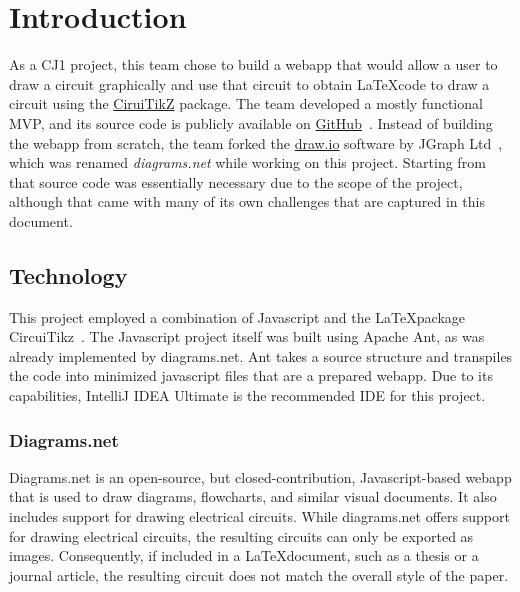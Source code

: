 %
\chapter{Introduction}\label{ch:introduction}
As a CJ1 project, this team chose to build a webapp that would allow a user to draw a circuit graphically and use that circuit to obtain \LaTeX code to draw a circuit using the \href{https://github.com/circuitikz/circuitikz}{CiruiTikZ} package.
The team developed a mostly functional MVP, and its source code is publicly available on \href{https://github.com/andre-a-alves/drawio-circuitikz}{GitHub}~\cite{sourcecode}.
Instead of building the webapp from scratch, the team forked the \href{https://github.com/jgraph/drawio}{draw.io} software by JGraph Ltd~\cite{drawioCode}, which was renamed \emph{diagrams.net} while working on this project.
Starting from that source code was essentially necessary due to the scope of the project, although that came with many of its own challenges that are captured in this document.

\section{Technology}\label{sec:technology}
This project employed a combination of Javascript and the \LaTeX package CircuiTikz~\cite{circuitikz}.
The Javascript project itself was built using Apache Ant, as was already implemented by diagrams.net.
Ant takes a source structure and transpiles the code into minimized javascript files that are a prepared webapp.
Due to its capabilities, IntelliJ IDEA Ultimate is the recommended IDE for this project.

\subsection{Diagrams.net}\label{subsec:diagrams-net}
Diagrams.net is an open-source, but closed-contribution, Javascript-based webapp that is used to draw diagrams, flowcharts, and similar visual documents.
It also includes support for drawing electrical circuits.
While diagrams.net offers support for drawing electrical circuits, the resulting circuits can only be exported as images.
Consequently, if included in a \LaTeX document, such as a thesis or a journal article, the resulting circuit does not match the overall style of the paper.

